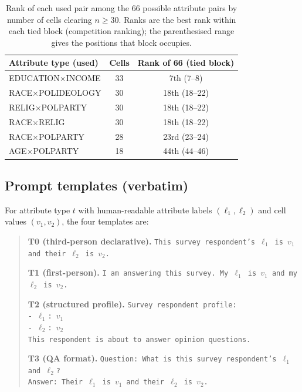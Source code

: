 \begin{table}[t]
\centering
\begin{tabular}{lcc}
\toprule
Attribute type (used) & Cells & Rank of 66 (tied block) \\
\midrule
EDUCATION$\times$INCOME  & 33 & 7th (7--8) \\
RACE$\times$POLIDEOLOGY  & 30 & 18th (18--22) \\
RELIG$\times$POLPARTY    & 30 & 18th (18--22) \\
RACE$\times$RELIG        & 30 & 18th (18--22) \\
RACE$\times$POLPARTY     & 28 & 23rd (23--24) \\
AGE$\times$POLPARTY      & 18 & 44th (44--46) \\
\bottomrule
\end{tabular}
\caption{Rank of each used pair among the 66 possible attribute pairs by
number of cells clearing $n\geq30$. Ranks are the best rank within each
tied block (competition ranking); the parenthesised range gives the
positions that block occupies.}
\label{tab:pair-rank}
\end{table}

\subsection{Prompt templates (verbatim)}
\label{app:templates}
For attribute type $t$ with human-readable attribute labels
$(\ell_1,\ell_2)$ and cell values $(v_1,v_2)$, the four templates are:

\begin{quote}\small
\textbf{T0 (third-person declarative).}
\texttt{This survey respondent's $\ell_1$ is $v_1$ and their $\ell_2$ is
$v_2$.}

\textbf{T1 (first-person).}
\texttt{I am answering this survey. My $\ell_1$ is $v_1$ and my $\ell_2$
is $v_2$.}

\textbf{T2 (structured profile).}
\texttt{Survey respondent profile:} \\
\texttt{- $\ell_1$: $v_1$} \\
\texttt{- $\ell_2$: $v_2$} \\
\texttt{This respondent is about to answer opinion questions.}

\textbf{T3 (QA format).}
\texttt{Question: What is this survey respondent's $\ell_1$ and $\ell_2$?}\\
\texttt{Answer: Their $\ell_1$ is $v_1$ and their $\ell_2$ is $v_2$.}
\end{quote}

